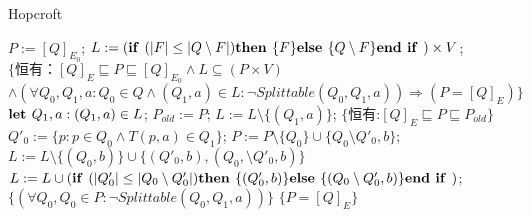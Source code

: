 \begin{algorithm}
    \caption{Hopcroft}\label{al:4-8}
    \small
    \begin{algorithmic}[1]
        \State $P:=[Q]_{E_0}$;
        \State $L:= ( \mbox{\textbf{if }} ( |F| \leq |Q \setminus F | ) \mbox{\textbf{then }} \{F\} \mbox{\textbf{else }} \{ Q \setminus F \} \mbox{\textbf{end if }} ) \times V $;
        \State $\{ \mbox{恒有：} [Q]_E \sqsubseteq P \sqsubseteq [Q]_{E_0} \land L \subseteq (P \times V) $
        \State \quad $ \land (\forall Q_0,Q_1,a:Q_0 \in Q \land (Q_1,a) \in L : \neg Splittable (Q_0,Q_1,a)) \Rightarrow (P=[Q]_E) \} $
            \State $ \mbox{\textbf{let }} Q_1,a:(Q_1,a) \in L $;
            \State $ P_{old} := P $;
            \State $ L := L \setminus \{ (Q_1,a) \} $;
            \State $ \{ \mbox{恒有:} [Q]_E \sqsubseteq P \sqsubseteq P_{old} \} $
                \State $ Q'_0 := \{ p:p \in Q_0 \land T(p,a) \in Q_1 \} $;
                \State $ P:= P \setminus \{ Q_0 \} \cup \{ Q_0 \setminus Q'_0,b \} $;
                       $ L := L \setminus \{ (Q_0,b) \} \cup \{ (Q'_0,b),(Q_0, \setminus Q'_0,b ) \} $
                        \State $L:= L \cup ( \mbox{\textbf{if }} ( |Q'_0| \leq |Q_0 \setminus Q'_0 | ) \mbox{\textbf{then }} \{(Q'_0,b)\} \mbox{\textbf{else }} \{ (Q_0 \setminus Q'_0,b) \} \mbox{\textbf{end if }} ) $;
                    \EndIf
                \EndFor
            \EndFor
            \State $ \{ (\forall Q_0,Q_0 \in P : \neg Splittable(Q_0,Q_1,a)) \} $
        \Until $\{ P = [Q]_E \}$
    \end{algorithmic}
\end{algorithm}


